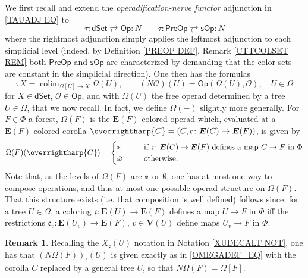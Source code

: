 \documentclass[a4paper,10pt
,draft
]{article}%
\numberwithin{equation}{section}
\numberwithin{figure}{section}
\theoremstyle{definition} %
\newtheorem{remark}[equation]{Remark}%
\newcommand{\vect}[1]{\text{\overrightharp{\ensuremath{#1}}}}
\DeclareMathOperator{\colim}{colim}%
\renewcommand{\O}{\ensuremath{\mathcal O}}
\newcommand{\1}{\ensuremath{\mathbbm 1}}%
\begin{document}
We first recall and extend the 
\emph{operadification-nerve functor}
adjunction in \eqref{TAUADJ EQ} to
\begin{equation}\label{TAUNER EQ}
	\tau\colon \mathsf{dSet}
	\rightleftarrows
	\mathsf{Op} \colon N
\qquad
	\tau\colon \mathsf{PreOp}
	\rightleftarrows
	\mathsf{sOp} \colon N
\end{equation}
where the rightmost adjunction 
simply applies the leftmost adjunction
to each simplicial level
(indeed, by Definition \ref{PREOP DEF}, 
Remark \ref{CTTCOLSET REM}
both $\mathsf{PreOp}$ and $\mathsf{sOp}$
are characterized by demanding that
the color sets are constant in the 
simplicial direction).
One then has the formulas
\[
\tau X = \colim_{\Omega[U] \to X} \Omega(U),
\qquad
(N \O) (U) = \mathsf{Op}(\Omega(U),\O),\quad U \in \Omega
\]
for $X \in \mathsf{dSet}$,
$\O \in \mathsf{Op}$,
and with $\Omega(U)$ the free operad determined by a tree 
$U \in \Omega$, that we now recall.
In fact, we define $\Omega(-)$ slightly more generally.
For $F \in \Phi$ a forest, 
$\Omega(F)$ is the $\boldsymbol{E}(F)$-colored operad
which, evaluated at
a $\boldsymbol{E}(F)$-colored corolla
$\vect{C} = 
(C,\mathfrak{c} \colon \boldsymbol{E}(C) \to \boldsymbol{E}(F))$,
is given by
\begin{equation}\label{OMEGADEF_EQ}
\Omega(F)(\vect C) =
	\begin{cases}
		\** \qquad & 
		\mbox{if
			$\mathfrak{c} \colon \boldsymbol{E}(C) \to \boldsymbol{E}(F)$
			defines a map $C \to F$ in $\Phi$}
	\\
		\varnothing & \text{otherwise.}
	\end{cases}
\end{equation}
Note that, as the levels of 
$\Omega(F)$ are $\**$ or $\emptyset$,
one has at most one way to compose operations,
and thus at most one possible operad structure on $\Omega(F)$.
That this structure exists 
(i.e. that composition is well defined)
follows since,
for a tree $U\in \Omega$,
a coloring
$\mathfrak{c} \colon \boldsymbol{E}(U) \to \boldsymbol{E}(F)$
defines a map
$U \to F$ in $\Phi$
iff
the restrictions
$\mathfrak{c}_v \colon \boldsymbol{E}(U_v) \to \boldsymbol{E}(F)$,
$v \in \boldsymbol{V}(U)$
define maps
$U_v \to F$ in $\Phi$.

\begin{remark}\label{NERVESIMDES REM}
	Recalling the $X_{\mathfrak{c}}(U)$ notation in 
	Notation \ref{XUDECALT NOT},
	one has that
	$\left(N\Omega(F)\right)_{\mathfrak{c}}(U)$
	is given exactly as in 
	\eqref{OMEGADEF_EQ} with the corolla $C$ replaced by a general tree $U$,
	so that
	$N\Omega(F) = \Omega[F]$.
\end{remark}
\end{document}
